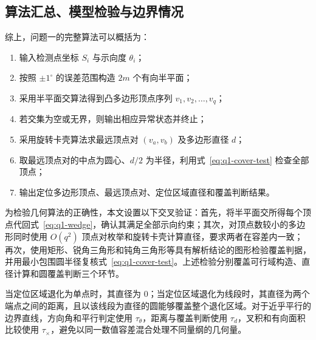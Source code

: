 \subsection{算法汇总、模型检验与边界情况}

综上，问题一的完整算法可以概括为：

\begin{enumerate}
  \item 输入检测点坐标 $S_i$ 与示向度 $\theta_i$；
  \item 按照 $\pm1^\circ$ 的误差范围构造 $2m$ 个有向半平面；
  \item 采用半平面交算法得到凸多边形顶点序列 $v_1,v_2,\ldots,v_q$；
  \item 若交集为空或无界，则输出相应异常状态并终止；
  \item 采用旋转卡壳算法求最远顶点对 $(v_a,v_b)$ 及多边形直径 $d$；
  \item 取最远顶点对的中点为圆心、$d/2$ 为半径，利用式~\eqref{eq:q1-cover-test} 检查全部顶点；
  \item 输出定位多边形顶点、最远顶点对、定位区域直径和覆盖判断结果。
\end{enumerate}

为检验几何算法的正确性，本文设置以下交叉验证：首先，将半平面交所得每个顶点代回式~\eqref{eq:q1-wedge}，确认其满足全部示向约束；其次，对顶点数较小的多边形同时使用 $O(q^2)$ 顶点对枚举和旋转卡壳计算直径，要求两者在容差内一致；再次，使用矩形、锐角三角形和钝角三角形等具有解析结论的图形检验覆盖判据，并用最小包围圆半径复核式~\eqref{eq:q1-cover-test}。上述检验分别覆盖可行域构造、直径计算和圆覆盖判断三个环节。

当定位区域退化为单点时，其直径为 $0$；当定位区域退化为线段时，其直径为两个端点之间的距离，且以该线段为直径的圆能够覆盖整个退化区域。对于近乎平行的边界直线，方向角和平行判定使用 $\tau_\theta$，距离与覆盖判断使用 $\tau_d$，叉积和有向面积比较使用 $\tau_\times$，避免以同一数值容差混合处理不同量纲的几何量。
